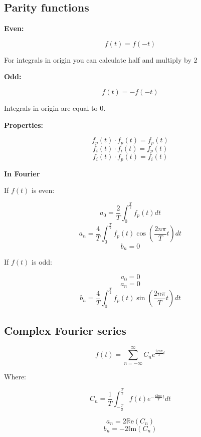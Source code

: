 \documentclass[letterpaper]{article}
\newcommand{\divline}{\noindent\makebox[\linewidth]{\rule{\textwidth}{0.4pt}}}
\begin{document}
	\divline
	
	\begin{multicols}{3}
		\section{Parity functions}
		
		\textbf{Even:}
		
		\[f(t) = f(-t)\]
		
		For integrals in origin you can calculate half and multiply by 2
		
		\textbf{Odd:}
		
		\[f(t) = - f(-t)\]
		
		Integrals in origin are equal to 0.
		
		\textbf{Properties:}
		
		\[f_{p}(t) \cdot f_{p}(t) = f_{p}(t)\]
		\[f_{i}(t) \cdot f_{i}(t) = f_{p}(t)\]
		\[f_{i}(t) \cdot f_{p}(t) = f_{i}(t)\]
		
		\textbf{In Fourier}
		
		If \(f(t)\) is even:
		
		\[a_{0} = \frac{2}{T} \int_{0}^{\frac{T}{2}} f_{p}(t) dt \]
		\[a_{n} = \frac{4}{T} \int_{0}^{\frac{T}{2}} f_{p}(t) \cos{(\frac{2 n \pi}{T} t)} dt \]
		\[b_{n} = 0\]
		
		If \(f(t)\) is odd:
		
		\[a_{0} = 0\]
		\[a_{n} = 0\]
		\[b_{n} = \frac{4}{T} \int_{0}^{\frac{T}{2}} f_{p}(t) \sin{(\frac{2 n \pi}{T} t)} dt \]
		
	\end{multicols}
	
	\divline
	
	\begin{multicols}{2}
		
		\section{Complex Fourier series}
		
		\[f(t) = \sum_{n = - \infty}^{\infty} C_{n} e^{\frac{i2n\pi}{T} t} \]
		
		Where:
		
		\[C_{n} = \frac{1}{T} \int_{-\frac{T}{2}}^{\frac{T}{2}} f(t) e^{-\frac{i2n\pi}{T}t} dt \]
		
		\[a_{n} = 2 \mathbb{R}\text{e}(C_{n})\]
		\[b_{n} = - 2 \mathbb{I}\text{m}(C_{n})\]
		
	\end{multicols}
	
	\divline
	
\end{document}
